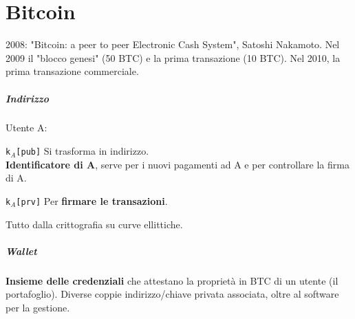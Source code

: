\documentclass[10pt]{book}
\begin{document}
\chapter{Bitcoin} 2008: "Bitcoin: a peer to peer Electronic Cash System", Satoshi Nakamoto. Nel 2009 il "blocco genesi" (50 BTC) e la prima transazione (10 BTC). Nel 2010, la prima transazione commerciale.
\paragraph{Indirizzo} Utente A:
\begin{list}{}{}
	\item \texttt{k$_A$[pub]} Si trasforma in indirizzo.\\
	\textbf{Identificatore di A}, serve per i nuovi pagamenti ad A e per controllare la firma di A.
	\item \texttt{k$_A$[prv]} Per \textbf{firmare le transazioni}.
\end{list}
Tutto dalla crittografia su curve ellittiche.
\paragraph{Wallet} \textbf{Insieme delle credenziali} che attestano la proprietà in BTC di un utente (il portafoglio). Diverse coppie indirizzo/chiave privata associata, oltre al software per la gestione.
\end{document}
